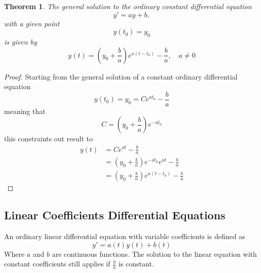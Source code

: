 \documentclass{article}
\newtheorem*{theorem2}{Theorem}
\begin{document}
\begin{theorem2}
    The general solution to the ordinary constant differential equation
    \[
        y' = ay + b,
    \]
    with a given point
    \[
        y(t_0) = y_0
    \]
    is given by
    \[
        y(t)=\left(y_0 + \frac{b}{a}\right) e^{a(t-t_0)}- \frac{b}{a},
        \quad a \neq 0
    \]
\end{theorem2}
\begin{proof}
    Starting from the general solution of a constant ordinary differential equation
    \[
        y(t_0) = y_0 = Ce^{at_0} - \frac{b}{a}
    \]
    meaning that
    \[
        C = \left(y_0 + \frac{b}{a}\right) e^{-at_0}
    \]
    this constraints out result to
    \begin{align*}
        y(t) &= Ce^{at} - \frac{b}{a} \\
             &= \left(y_0 + \frac{b}{a}\right) e^{-at_0} e^{at} - \frac{b}{a} \\
             &= \left(y_0 + \frac{b}{a}\right) e^{a(t-t_0)} - \frac{b}{a}
    \end{align*}
\end{proof}

\subsection{Linear Coefficients Differential Equations}

An ordinary linear differential equation with variable coefficients is defined as
\[
    y' = a(t)y(t) + b(t)
\]
Where \(a\) and \(b\) are continuous functions.
The solution to the linear equation with constant coefficients still applies
if \(\frac{b}{a}\) is constant.
\end{document}
